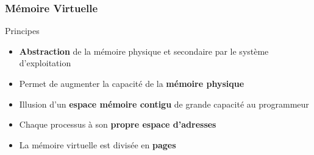 \documentclass[8pt]{beamer}
\begin{document}
\begin{frame}
    \frametitle{Mémoire Virtuelle}
    \begin{block}{Principes}
        \begin{itemize}
            \item \textbf{Abstraction} de la mémoire physique et secondaire par
                  le système d'exploitation
            \item Permet de \fg{} augmenter la capacité de la
                  \textbf{mémoire physique}
            \item Illusion d’un \textbf{espace mémoire
                      contigu} de grande capacité au programmeur
            \item Chaque processus \`a son \textbf{propre espace
                      d'adresses}
            \item La mémoire virtuelle est divisée en \textbf{pages}
        \end{itemize}
    \end{block}
\end{frame}
\end{document}
